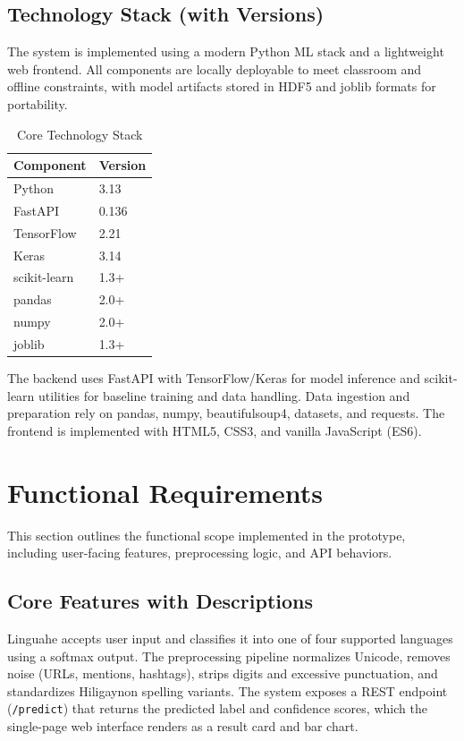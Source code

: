 \documentclass[conference]{IEEEtran}
\begin{document}
\subsection{Technology Stack (with Versions)}
The system is implemented using a modern Python ML stack and a lightweight web frontend. All components are locally deployable to meet classroom and offline constraints, with model artifacts stored in HDF5 and joblib formats for portability.
\begin{table}[htbp]
\caption{Core Technology Stack}
\label{tab:tech-stack}
\centering
\begin{tabular}{ll}
\hline
\textbf{Component} & \textbf{Version} \\
\hline
Python & 3.13 \\
FastAPI & 0.136 \\
TensorFlow & 2.21 \\
Keras & 3.14 \\
scikit-learn & 1.3+ \\
pandas & 2.0+ \\
numpy & 2.0+ \\
joblib & 1.3+ \\
\hline
\end{tabular}
\end{table}
The backend uses FastAPI with TensorFlow/Keras for model inference and scikit-learn utilities for baseline training and data handling. Data ingestion and preparation rely on pandas, numpy, beautifulsoup4, datasets, and requests. The frontend is implemented with HTML5, CSS3, and vanilla JavaScript (ES6).


\section{Functional Requirements}
This section outlines the functional scope implemented in the prototype, including user-facing features, preprocessing logic, and API behaviors.
\subsection{Core Features with Descriptions}
Linguahe accepts user input and classifies it into one of four supported languages using a softmax output. The preprocessing pipeline normalizes Unicode, removes noise (URLs, mentions, hashtags), strips digits and excessive punctuation, and standardizes Hiligaynon spelling variants. The system exposes a REST endpoint (\texttt{/predict}) that returns the predicted label and confidence scores, which the single-page web interface renders as a result card and bar chart.
\end{document}
